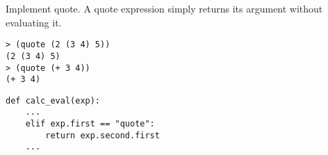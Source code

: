 \question Implement quote. A quote expression simply returns its argument
without evaluating it.

\begin{lstlisting}
> (quote (2 (3 4) 5))
(2 (3 4) 5)
> (quote (+ 3 4))
(+ 3 4)
\end{lstlisting}
\begin{solution}[1.5in]
\begin{lstlisting}
def calc_eval(exp):
    ...
    elif exp.first == "quote":
        return exp.second.first
    ...
\end{lstlisting}
\end{solution}

